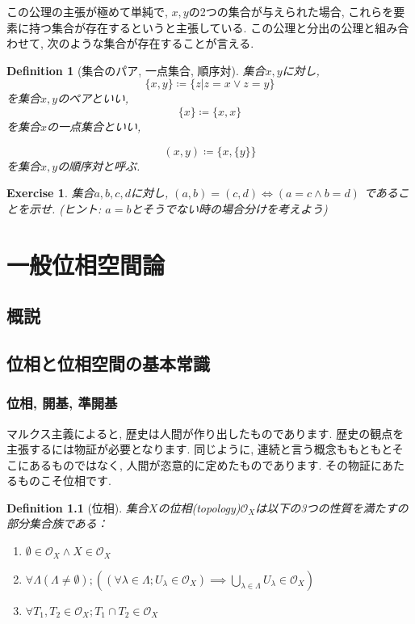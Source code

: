 \documentclass[lualatex]{ltjsbook}
\newtheorem{definition}[theorem]{Definition}
\theoremstyle{remark}
\theoremstyle{plain}
\newtheorem{exercise}[theorem]{Exercise}
\begin{document}
この公理の主張が極めて単純で, $x,y$の2つの集合が与えられた場合, これらを要素に持つ集合が存在するというと主張している. この公理と分出の公理と組み合わせて, 次のような集合が存在することが言える.

\begin{definition}[集合のパア, 一点集合, 順序対]
	集合$x,y$に対し, 
	\[
	\{x,y\} \coloneqq \{z| z = x \lor z = y\}  
	\]
	を集合$x,y$のペアといい,
	$$
	\{x\} \coloneqq \{x,x\}  
	$$
	を集合$x$の一点集合といい,

	\[
		(x,y) \coloneqq \{x, \{y\} \} 
	\]
	を集合$x,y$の順序対と呼ぶ.
\end{definition}

\begin{exercise}
	集合$a,b,c,d$に対し,  $(a,b) = (c,d) \iff \left( a=c \land b=d \right) $ であることを示せ. (ヒント: $a=b$とそうでない時の場合分けを考えよう)
\end{exercise}


\part{一般位相空間論}
\chapter*{概説}


\chapter{位相と位相空間の基本常識}

\section{位相, 開基,  準開基}

マルクス主義によると,  歴史は人間が作り出したものであります. 歴史の観点を主張するには物証が必要となります.
同じように,  連続と言う概念ももともとそこにあるものではなく,  人間が恣意的に定めたものであります. その物証にあたるものこそ位相です. 


\begin{definition}[位相]
	集合$X$の位相\textit{(topology)}$\mathcal{O}_X$は以下の3つの性質を満たすの部分集合族である：

	\begin{enumerate}
		\item $\emptyset \in \mathcal{O}_X \land X \in \mathcal{O}_X$
		\item $\forall \Lambda\left( \Lambda \neq \emptyset \right) ;\left( \left( \forall \lambda \in \Lambda; U_{\lambda} \in \mathcal{O}_X \right) \implies \bigcup_{\lambda \in \Lambda} U_{\lambda} \in \mathcal{O}_X \right) $ 
		\item $\forall T_1,  T_2 \in \mathcal{O}_X; T_1\cap T_2 \in \mathcal{O}_X$
	\end{enumerate}

\end{definition}
\end{document}
